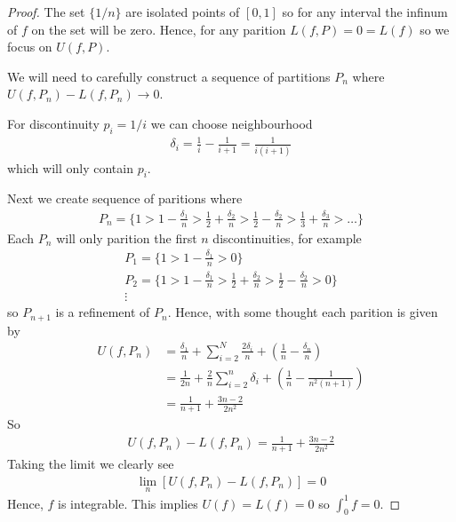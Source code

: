 \begin{proof}
    The set $\{1/n\}$ are isolated points of $[0,1]$ so for any interval 
    the infinum of $f$ on the set will be zero. Hence, for any parition 
    $L(f,P) = 0 = L(f)$ so we focus on $U(f,P)$.

    We will need to carefully construct a sequence of partitions $P_n$
    where $U(f, P_n) - L(f, P_n) \rightarrow 0$. 

    For discontinuity $p_i = 1/i$ we can choose neighbourhood 
    \begin{align*}
        \delta_i = \frac{1}{i} - \frac{1}{i+1} = \frac{1}{i(i+1)} 
    \end{align*}
    which will only contain $p_i$.

    Next we create sequence of paritions where 
    \begin{align*}
        P_n = \{ 1 > 1-\frac{\delta_1}{n} > \frac{1}{2}+\frac{\delta_2}{n} > \frac{1}{2}-\frac{\delta_2}{n} > \frac{1}{3}+\frac{\delta_3}{n} > \dots\}
    \end{align*}
    Each $P_n$ will only parition the first $n$ discontinuities, for example
    \begin{gather*}
        P_1 = \{ 1 > 1-\frac{\delta_1}{n} > 0 \} \\
        P_2 = \{ 1 > 1-\frac{\delta_1}{n}  > \frac{1}{2}+\frac{\delta_2}{n} > \frac{1}{2}-\frac{\delta_2}{n} > 0\} \\
        \vdots
    \end{gather*}
    so $P_{n+1}$ is a refinement of $P_{n}$. 
    Hence, with some thought each parition is given by  
    \begin{align*}
        U(f,P_n) &= \frac{\delta_1}{n} + \sum_{i=2}^N \frac{2\delta_i}{n} + (\frac{1}{n} - \frac{\delta_n}{n}) \\
        &= \frac{1}{2n} + \frac{2}{n} \sum_{i=2}^n \delta_i + (\frac{1}{n} - \frac{1}{n^2 (n+1)}) \\
        &= \frac{1}{n+1} + \frac{3n-2}{2n^2}
    \end{align*}
    So 
    \begin{align*}
        U(f,P_n) - L(f,P_n) = \frac{1}{n+1} + \frac{3n-2}{2n^2}
    \end{align*}
    Taking the limit we clearly see 
    \begin{align*}
        \lim_n [U(f,P_n) - L(f,P_n)] = 0
    \end{align*}
    Hence, $f$ is integrable. This implies $U(f)=L(f)=0$ so $\int_0^1 f = 0$.
\end{proof}

